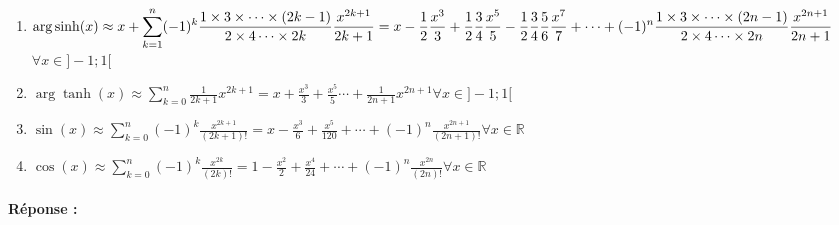 \documentclass[11pt,a4paper]{article}
\begin{document}
\begin{enumerate}
\item $\displaystyle\arg\sinh(x) \approx x + \sum_{k=1}^{n}  (-1)^k \frac{1\times 3\times\cdots\times (2k-1)}{2\times 4\cdots\times 2k}\frac{x^{2k+1}}{2k+1} =\\  x - \frac{1}{2} \frac{x^3}{3} + \frac{1}{2} \frac{3}{4} \frac{x^5}{5} - \frac{1}{2} \frac{3}{4} \frac{5}{6}\frac{x^7}{7} + \cdots + (-1)^n \frac{1\times 3\times\cdots\times (2n-1)}{2\times 4\cdots\times 2n}\frac{x^{2n+1}}{2n+1}$ \hfill$\forall x \in ]-1;1[$  
\item $\displaystyle\arg\tanh(x) \approx \sum_{k=0}^{n} \frac{1}{2k+1}x^{2k+1} = x + \frac{x^3}{3} + \frac{x^5}{5}\cdots + \frac{1}{2n+1}x^{2n+1}$\hfill$\forall x \in ]-1;1[$  	
\item $\displaystyle\sin(x) \approx \sum_{k=0}^{n} (-1)^k\frac{x^{2k+1}}{(2k+1)!} = 		x - \frac{x^3}{6} + \frac{x^5}{120} + \cdots + (-1)^n\frac{x^{2n+1}}{(2n+1)!}$\hfill$\forall x \in \mathbb{R}$
\item $\displaystyle\cos(x) \approx \sum_{k=0}^{n} (-1)^k\frac{x^{2k}}{(2k)!} =         1 - \frac{x^2}{2} + \frac{x^4}{24} + \cdots + (-1)^n\frac{x^{2n}}{(2n)!}$\hfill$\forall x \in \mathbb{R}$
\end{enumerate}

%

\paragraph{Réponse :}\mbox{}

\noindent\framebox[\textwidth]{$\rule{0cm}{0.86\textheight}$}


\end{document}
